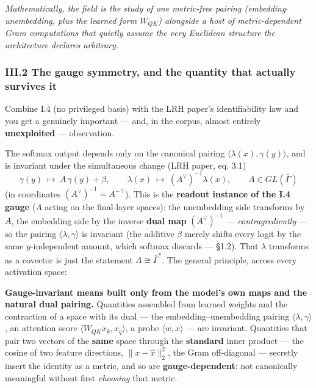 \begin{callout}
\emph{Mathematically, the field is the study of one metric-free pairing (embedding$\cdot$unembedding, plus the learned form $W_{QK}$) alongside a host of metric-dependent Gram computations that quietly assume the very Euclidean structure the architecture declares arbitrary.}

\end{callout}

\subsubsection*{III.2 The gauge symmetry, and the quantity that actually survives it}

Combine I.4 (no privileged basis) with the LRH paper's identifiability law and you get a genuinely important --- and, in the corpus, almost entirely \textbf{unexploited} --- observation.


The softmax output depends only on the canonical pairing $\langle\lambda(x),\gamma(y)\rangle$, and is invariant under the simultaneous change (LRH paper, eq. 3.1) \[ \gamma(y)\ \mapsto\ A\,\gamma(y)+\beta, \qquad \lambda(x)\ \mapsto\ (A^{\vee})^{-1}\lambda(x), \qquad A\in GL(\bar\Gamma) \] (in coordinates $(A^{\vee})^{-1}=A^{-\top}$). This is the \textbf{readout instance of the I.4 gauge} ($A$ acting on the final-layer spaces): the unembedding side transforms by $A$, the embedding side by the inverse \textbf{dual map} $(A^{\vee})^{-1}$ --- \emph{contragrediently} --- so the pairing $\langle\lambda,\gamma\rangle$ is invariant (the additive $\beta$ merely shifts every logit by the same $y$-independent amount, which softmax discards --- §1.2). That $\lambda$ transforms as a covector is just the statement $\Lambda\cong\bar\Gamma^{*}$. The general principle, across every activation space:


\begin{callout}
\textbf{Gauge-invariant means built only from the model's own maps and the natural dual pairing.} Quantities assembled from learned weights and the contraction of a space with its dual --- the embedding--unembedding pairing $\langle\lambda,\gamma\rangle$, an attention score $\langle W_{QK}x_k, x_q\rangle$, a probe $\langle w,x\rangle$ --- are invariant. Quantities that pair two vectors of the \textbf{same} space through the \textbf{standard} inner product --- the cosine of two feature directions, $\|x-\hat x\|_2^2$, the Gram off-diagonal --- secretly insert the identity as a metric, and so are \textbf{gauge-dependent}: not canonically meaningful without first \emph{choosing} that metric.

\end{callout}

